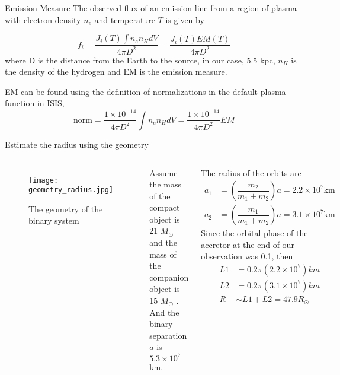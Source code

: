 \documentclass{beamer}
\begin{document}
\begin{frame}{Emission Measure}
The observed flux of an emission line from a region of plasma with electron density $n_e$ and temperature $T$ is given by

\begin{equation*}
    f_i = \dfrac{J_i(T)\int n_en_H dV }{4\pi D^2} = \dfrac{J_i(T)EM(T)}{4\pi D^2}
\end{equation*}
where D is the distance from the Earth to the source, in our case, 5.5 kpc, $n_H$ is the density of the hydrogen and EM is the emission measure.\par 

EM can be found using the definition of normalizations in the default plasma function in ISIS,
\begin{equation*}
    \mathrm{norm} = \dfrac{1\times 10^{-14}}{4\pi D^2}\int n_e n_H dV =  \dfrac{1\times 10^{-14}}{4\pi D^2} EM
\end{equation*}
\end{frame}


\scriptsize
\begin{frame}{Estimate the radius using the geometry}
       \begin{columns}
            \begin{figure}
                \centering
                \texttt{[image: geometry\_radius.jpg]}
                \caption{The geometry of the binary system}
                \label{geometry_radius}
            \end{figure}
            
            Assume the mass of the compact object is 21 $M_{\odot}$ and the mass of the companion object is 15 $M_{\odot}$ \citep{Bowler2018}. And the binary separation $a$ is $5.3 \times 10^7$ km. \par
            The radius of the orbits are 
            \begin{align*}
                a_1 &= (\dfrac{m_2}{m_1 + m_2})a = 2.2\times10^7 \mathrm{km}\\
                a_2 &= (\dfrac{m_1}{m_1 + m_2})a = 3.1\times10^7 \mathrm{km}
            \end{align*}
            Since the orbital phase of the accretor at the end of our observation was 0.1, then
              \begin{align*}
                L1 &= 0.2\pi(2.2\times10^7) km\\
                L2 &= 0.2\pi(3.1\times10^7) km\\
                R &\sim L1 + L2 = 47.9 R_{\odot}
             \end{align*}
         \end{columns} 
    
\end{frame}
\end{document}
